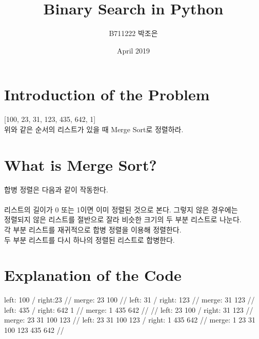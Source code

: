 \documentclass{article}
\begin{document}
\title{Binary Search in Python}
\author{B711222 박조은}
\date{April 2019}
\maketitle

\section{Introduction of the Problem}
[100, 23, 31, 123, 435, 642, 1]\\
위와 같은 순서의 리스트가 있을 때 Merge Sort로 정렬하라.

\section{What is Merge Sort?}
합병 정렬은 다음과 같이 작동한다.\\
\\
리스트의 길이가 0 또는 1이면 이미 정렬된 것으로 본다. 그렇지 않은 경우에는\\
정렬되지 않은 리스트를 절반으로 잘라 비슷한 크기의 두 부분 리스트로 나눈다.\\
각 부분 리스트를 재귀적으로 합병 정렬을 이용해 정렬한다.\\
두 부분 리스트를 다시 하나의 정렬된 리스트로 합병한다.\\

\section{Explanation of the Code}
left: 100 / right:23 //
merge: 23 100 //
left: 31 / right: 123 //
merge: 31 123 //
left: 435 / right: 642 1 //
merge: 1 435 642 //
 //
left: 23 100 / right: 31 123 //
merge: 23 31 100 123 //
left: 23 31 100 123 / right: 1 435 642 //
merge: 1 23 31 100 123 435 642 //
\end{document}
